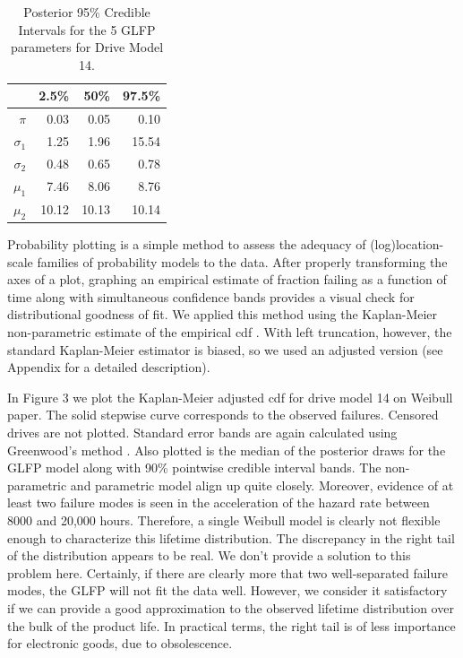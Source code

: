 \documentclass[12pt]{article}
\begin{document}
\begin{table}[H]
\centering
\begin{tabular}{rrrr}
  \hline
 & 2.5\% & 50\% & 97.5\% \\ 
  \hline
$\pi$ & 0.03 & 0.05 & 0.10 \\ 
 $\sigma_1$ & 1.25 & 1.96 & 15.54 \\ 
  $\sigma_2$ & 0.48 & 0.65 & 0.78 \\ 
  $\mu_1$ & 7.46 & 8.06 & 8.76 \\ 
  $\mu_2$ & 10.12 & 10.13 & 10.14 \\ 
   \hline
\end{tabular}
\caption{Posterior 95\% Credible Intervals for the 5 GLFP parameters for Drive Model 14.}
\label{table:1}
\end{table}

Probability plotting is a simple method to assess the adequacy of (log)location-scale families of probability models to the data.  After properly transforming the axes of a plot, graphing an empirical estimate of fraction failing as a function of time along with simultaneous confidence bands provides a visual check for distributional goodness of fit.  We applied this method using the Kaplan-Meier non-parametric estimate of the empirical cdf \cite{kaplan}.  With left truncation, however, the standard Kaplan-Meier estimator is biased, so we used an adjusted version (see Appendix for a detailed description).   

In Figure 3 we plot the Kaplan-Meier adjusted cdf for drive model 14 on Weibull paper.  The solid stepwise curve corresponds to the observed failures.  Censored drives are not plotted.  Standard error bands are again calculated using Greenwood's method \cite{green}.  Also plotted is the median of the posterior draws for the GLFP model along with 90\% pointwise credible interval bands.  The non-parametric and parametric model align up quite closely.  Moreover, evidence of at least two failure modes is seen in the acceleration of the hazard rate between 8000 and 20,000 hours.  Therefore, a single Weibull model is clearly not flexible enough to characterize this lifetime distribution. The discrepancy in the right tail of the distribution appears to be real. We don't provide a solution to this problem here. Certainly, if there are clearly more that two well-separated failure modes, the GLFP will not fit the data well. However, we consider it satisfactory if we can provide a good approximation to the observed lifetime distribution over the bulk of the product life. In practical terms, the right tail is of less importance for electronic goods, due to obsolescence.
\end{document}

